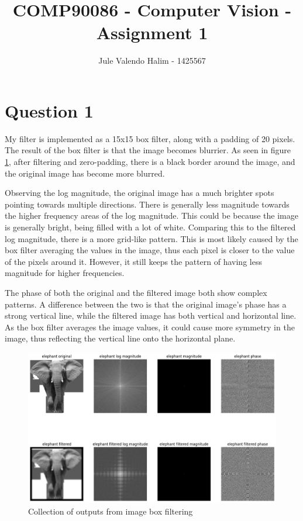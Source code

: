 \documentclass{article}
\title{\textbf{COMP90086 - Computer Vision - Assignment 1}}
\author{Jule Valendo Halim - 1425567}
\begin{document}
\maketitle

\section*{Question 1}

My filter is implemented as a 15x15 box filter, along with a padding of 20 pixels. The result of the box filter is that the image becomes blurrier. As seen in figure \ref{fig:boxfilter1}, after filtering and zero-padding, there is a black border around the image, and the original image has become more blurred. 

Observing the log magnitude, the original image has a much brighter spots pointing towards multiple directions. There is generally less magnitude towards the higher frequency areas of the log magnitude. This could be because the image is generally bright, being filled with a lot of white. Comparing this to the filtered log magnitude, there is a more grid-like pattern. This is most likely caused by the box filter averaging the values in the image, thus each pixel is closer to the value of the pixels around it. However, it still keeps the pattern of having less magnitude for higher frequencies.

The phase of both the original and the filtered image both show complex patterns. A difference between the two is that the original image's phase has a strong vertical line, while the filtered image has both vertical and horizontal line. As the box filter averages the image values, it could cause more symmetry in the image, thus reflecting the vertical line onto the horizontal plane.

\begin{figure}[h!]
    \centering
    \includegraphics[scale=0.5]{images/box_filter_elephant.png}
    \caption{Collection of outputs from image box filtering}
    \label{fig:boxfilter1}
\end{figure}
\newpage
\end{document}
